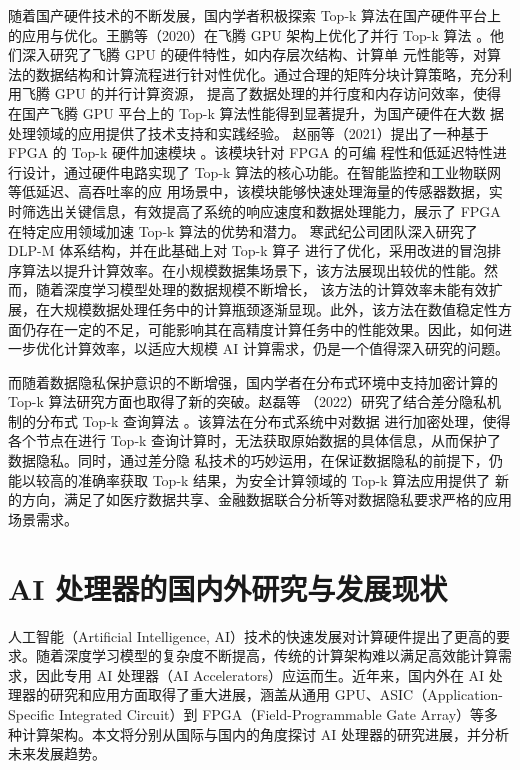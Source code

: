 随着国产硬件技术的不断发展，国内学者积极探索 Top-k 算法在国产硬件平台上的应用与优化。王鹏等（2020）在飞腾 GPU 
架构上优化了并行 Top-k 算法 \cite {wang2020}。他们深入研究了飞腾 GPU 的硬件特性，如内存层次结构、计算单
元性能等，对算法的数据结构和计算流程进行针对性优化。通过合理的矩阵分块计算策略，充分利用飞腾 GPU 的并行计算资源，
提高了数据处理的并行度和内存访问效率，使得在国产飞腾 GPU 平台上的 Top-k 算法性能得到显著提升，为国产硬件在大数
据处理领域的应用提供了技术支持和实践经验。
赵丽等（2021）提出了一种基于 FPGA 的 Top-k 硬件加速模块 \cite {Zhao2021}。该模块针对 FPGA 的可编
程性和低延迟特性进行设计，通过硬件电路实现了 Top-k 算法的核心功能。在智能监控和工业物联网等低延迟、高吞吐率的应
用场景中，该模块能够快速处理海量的传感器数据，实时筛选出关键信息，有效提高了系统的响应速度和数据处理能力，展示了 
FPGA 在特定应用领域加速 Top-k 算法的优势和潜力。
寒武纪公司团队深入研究了 DLP-M 体系结构，并在此基础上对 Top-k 算子 进行了优化，采用改进的冒泡排序算法以提升计算效率。在小规模数据集场景下，该方法展现出较优的性能。然而，随着深度学习模型处理的数据规模不断增长，
该方法的计算效率未能有效扩展，在大规模数据处理任务中的计算瓶颈逐渐显现。此外，该方法在数值稳定性方面仍存在一定的不足，可能影响其在高精度计算任务中的性能效果。因此，如何进一步优化计算效率，以适应大规模 AI 计算需求，仍是一个值得深入研究的问题。

而随着数据隐私保护意识的不断增强，国内学者在分布式环境中支持加密计算的 Top-k 算法研究方面也取得了新的突破。赵磊等
（2022）研究了结合差分隐私机制的分布式 Top-k 查询算法 \cite {zhao2022}。该算法在分布式系统中对数据
进行加密处理，使得各个节点在进行 Top-k 查询计算时，无法获取原始数据的具体信息，从而保护了数据隐私。同时，通过差分隐
私技术的巧妙运用，在保证数据隐私的前提下，仍能以较高的准确率获取 Top-k 结果，为安全计算领域的 Top-k 算法应用提供了
新的方向，满足了如医疗数据共享、金融数据联合分析等对数据隐私要求严格的应用场景需求。

\section{AI 处理器的国内外研究与发展现状}

人工智能（Artificial Intelligence, AI）技术的快速发展对计算硬件提出了更高的要求。随着深度学习模型的复杂度不断提高，传统的计算架构难以满足高效能计算需求，因此专用 AI 处理器（AI Accelerators）应运而生。近年来，国内外在 AI 处理器的研究和应用方面取得了重大进展，涵盖从通用 GPU、ASIC（Application-Specific Integrated Circuit）到 FPGA（Field-Programmable Gate Array）等多种计算架构。本文将分别从国际与国内的角度探讨 AI 处理器的研究进展，并分析未来发展趋势。

